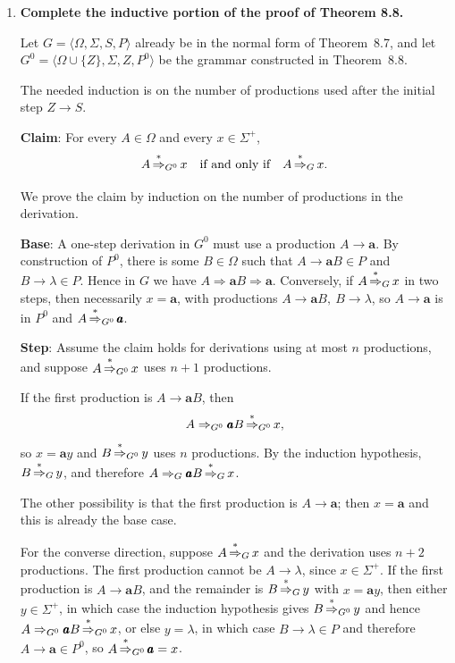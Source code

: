 \begin{enumerate}[{8.}1. ]
\item \textbf{Complete the inductive portion of the proof of Theorem 8.8.}

Let $G=\langle\Omega,\Sigma,S,P\rangle$ already be in the normal form of
Theorem~8.7, and let $G^0=\langle\Omega\cup\{Z\},\Sigma,Z,P^0\rangle$ be the
grammar constructed in Theorem~8.8.

The needed induction is on the number of productions used after the initial
step $Z\to S$.

\textbf{Claim}: For every $A\in\Omega$ and every $x\in\Sigma^+$,
\[
A\operatorname{\overset{*}{\Rightarrow}}_{G^0} x \quad\text{if and only if}\quad A\operatorname{\overset{*}{\Rightarrow}}_G x.
\]

We prove the claim by induction on the number of productions in the derivation.

\textbf{Base}: A one-step derivation in $G^0$ must use a production
$A\to\pmb{a}$. By construction of $P^0$, there is some $B\in\Omega$ such that
$A\to\pmb{a}B\in P$ and $B\to\lambda\in P$. Hence in $G$ we have
$A\Rightarrow\pmb{a}B\Rightarrow\pmb{a}$. Conversely, if $A\operatorname{\overset{*}{\Rightarrow}}_G x$ in
two steps, then necessarily $x=\pmb{a}$, with productions
$A\to\pmb{a}B,\ B\to\lambda$, so $A\to\pmb{a}$ is in $P^0$ and
$A\operatorname{\overset{*}{\Rightarrow}}_{G^0}\pmb{a}$.

\textbf{Step}: Assume the claim holds for derivations using at most $n$
productions, and suppose $A\operatorname{\overset{*}{\Rightarrow}}_{G^0} x$ uses $n+1$ productions.

If the first production is $A\to\pmb{a}B$, then
\[
A\Rightarrow_{G^0}\pmb{a}B\operatorname{\overset{*}{\Rightarrow}}_{G^0} x,
\]
so $x=\pmb{a}y$ and $B\operatorname{\overset{*}{\Rightarrow}}_{G^0} y$ uses $n$ productions. By the
induction hypothesis, $B\operatorname{\overset{*}{\Rightarrow}}_G y$, and therefore
$A\Rightarrow_G\pmb{a}B\operatorname{\overset{*}{\Rightarrow}}_G x$.

The other possibility is that the first production is $A\to\pmb{a}$; then
$x=\pmb{a}$ and this is already the base case.

For the converse direction, suppose $A\operatorname{\overset{*}{\Rightarrow}}_G x$ and the derivation uses
$n+2$ productions. The first production cannot be $A\to\lambda$, since
$x\in\Sigma^+$. If the first production is $A\to\pmb{a}B$, and the remainder is
$B\operatorname{\overset{*}{\Rightarrow}}_G y$ with $x=\pmb{a}y$, then either $y\in\Sigma^+$, in which
case the induction hypothesis gives $B\operatorname{\overset{*}{\Rightarrow}}_{G^0} y$ and hence
$A\Rightarrow_{G^0}\pmb{a}B\operatorname{\overset{*}{\Rightarrow}}_{G^0} x$, or else $y=\lambda$, in which
case $B\to\lambda\in P$ and therefore $A\to\pmb{a}\in P^0$, so
$A\operatorname{\overset{*}{\Rightarrow}}_{G^0}\pmb{a}=x$.


\end{enumerate}
